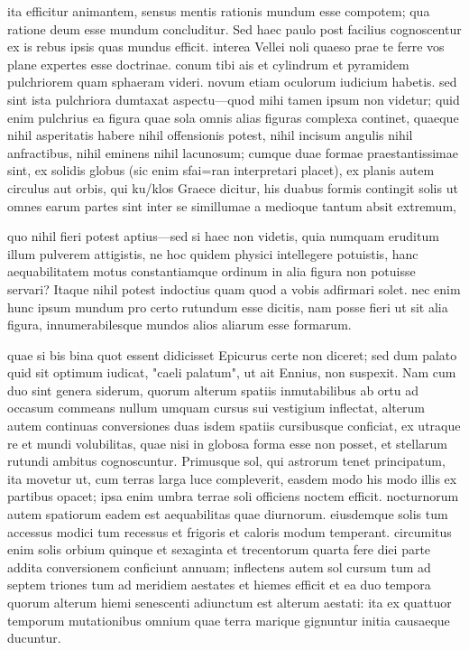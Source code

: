  ita efficitur animantem, sensus mentis rationis mundum esse compotem; qua ratione deum esse mundum concluditur. Sed haec paulo post facilius cognoscentur ex is rebus ipsis quas mundus efficit. interea Vellei noli quaeso prae te ferre vos plane expertes esse doctrinae. conum tibi ais et cylindrum et pyramidem pulchriorem quam sphaeram videri. novum etiam oculorum iudicium habetis. sed sint ista pulchriora dumtaxat aspectu—quod mihi tamen ipsum non videtur; quid enim pulchrius ea figura quae sola omnis alias figuras complexa continet, quaeque nihil asperitatis habere nihil offensionis potest, nihil incisum angulis nihil anfractibus, nihil eminens nihil lacunosum; cumque duae formae praestantissimae sint, ex solidis globus (sic enim sfai=ran interpretari placet), ex planis autem circulus aut orbis, qui ku/klos Graece dicitur, his duabus formis contingit solis ut omnes earum partes sint inter se simillumae a medioque tantum absit extremum,

 quo nihil fieri potest aptius—sed si haec non videtis, quia numquam eruditum illum pulverem attigistis, ne hoc quidem physici intellegere potuistis, hanc aequabilitatem motus constantiamque ordinum in alia figura non potuisse servari? Itaque nihil potest indoctius quam quod a vobis adfirmari solet. nec enim hunc ipsum mundum pro certo rutundum esse dicitis, nam posse fieri ut sit alia figura, innumerabilesque mundos alios aliarum esse formarum.

 quae si bis bina quot essent didicisset Epicurus certe non diceret; sed dum palato quid sit optimum iudicat, "caeli palatum", ut ait Ennius, non suspexit. Nam cum duo sint genera siderum, quorum alterum spatiis inmutabilibus ab ortu ad occasum commeans nullum umquam cursus sui vestigium inflectat, alterum autem continuas conversiones duas isdem spatiis cursibusque conficiat, ex utraque re et mundi volubilitas, quae nisi in globosa forma esse non posset, et stellarum rutundi ambitus cognoscuntur. Primusque sol, qui astrorum tenet principatum, ita movetur ut, cum terras larga luce compleverit, easdem modo his modo illis ex partibus opacet; ipsa enim umbra terrae soli officiens noctem efficit. nocturnorum autem spatiorum eadem est aequabilitas quae diurnorum. eiusdemque solis tum accessus modici tum recessus et frigoris et caloris modum temperant. circumitus enim solis orbium quinque et sexaginta et trecentorum quarta fere diei parte addita conversionem conficiunt annuam; inflectens autem sol cursum tum ad septem triones tum ad meridiem aestates et hiemes efficit et ea duo tempora quorum alterum hiemi senescenti adiunctum est alterum aestati: ita ex quattuor temporum mutationibus omnium quae terra marique gignuntur initia causaeque ducuntur.

